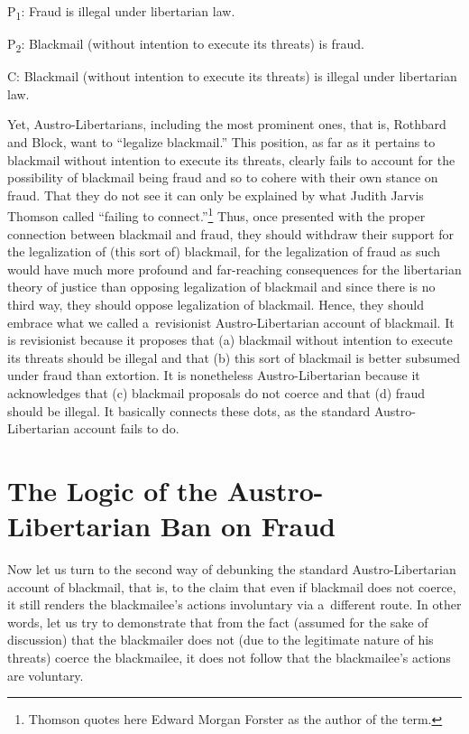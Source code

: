 {P\textsubscript{1}: Fraud is illegal under libertarian law.



P\textsubscript{2}: Blackmail (without intention to execute its threats) is fraud.



C: Blackmail (without intention to execute its threats) is illegal under libertarian law.



Yet, Austro-Libertarians, including the most prominent ones, that is, Rothbard and Block, want to ``legalize blackmail.'' 
\parencite[see][]{block_legalize_2013} %
 This position, as far as it pertains to blackmail without intention to execute its threats, clearly fails to account for the possibility of blackmail being fraud and so to cohere with their own stance on fraud. That they do not see it can only be explained by what Judith Jarvis Thomson 
\parencite*[][pp.25–33]{thomson_realm_1990} %
 called ``failing to connect.''\footnote{Thomson quotes here Edward Morgan Forster 
\parencite*[][]{forster_howards_1941} %
 as the author of the term.} Thus, once presented with the proper connection between blackmail and fraud, they should withdraw their support for the legalization of (this sort of) blackmail, for the legalization of fraud as such would have much more profound and far-reaching consequences for the libertarian theory of justice than opposing legalization of blackmail and since there is no third way, they should oppose legalization of blackmail. Hence, they should embrace what we called a~revisionist Austro-Libertarian account of blackmail. It is revisionist because it proposes that (a) blackmail without intention to execute its threats should be illegal and that (b) this sort of blackmail is better subsumed under fraud than extortion. It is nonetheless Austro-Libertarian because it acknowledges that (c) blackmail proposals do not coerce and that (d) fraud should be illegal. It basically connects these dots, as the standard Austro-Libertarian account fails to do.



\section{The Logic of the Austro-Libertarian Ban on Fraud}

Now let us turn to the second way of debunking the standard Austro-Libertarian account of blackmail, that is, to the claim that even if blackmail does not coerce, it still renders the blackmailee's actions involuntary via a~different route. In other words, let us try to demonstrate that from the fact (assumed for the sake of discussion) that the blackmailer does not (due to the legitimate nature of his threats) coerce the blackmailee, it does not follow that the blackmailee's actions are voluntary.



}
